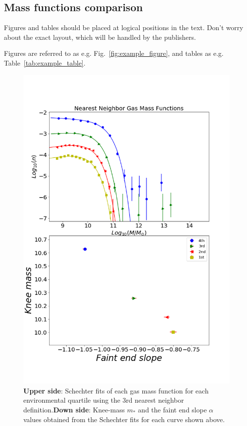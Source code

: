 \documentclass[a4paper,fleqn,usenatbib]{mnras}
\begin{document}
\subsection{Mass functions comparison}

Figures and tables should be placed at logical positions in the text. Don't
worry about the exact layout, which will be handled by the publishers.

Figures are referred to as e.g. Fig.~\ref{fig:example_figure}, and tables as
e.g. Table~\ref{tab:example_table}.

\begin{figure}
	\includegraphics[width=\columnwidth]{./pics/quartilesGas.png}
    \caption{\textbf{Upper side}: Schechter fits of each gas mass function for each environmental quartile using the 3rd nearest neighbor definition.\textbf{Down side}: Knee-mass $m_\ast$ and the faint end slope $\alpha$ values obtained from the Schechter fits for each curve shown above.}
    \label{fig:quartilesGas}
\end{figure}
\end{document}
